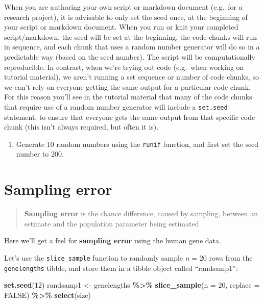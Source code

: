 \documentclass[
]{book}
\newenvironment{Shaded}{\begin{snugshade}}{\end{snugshade}}
\newcommand{\AttributeTok}[1]{\textcolor[rgb]{0.13,0.29,0.53}{#1}}
\newcommand{\ConstantTok}[1]{\textcolor[rgb]{0.56,0.35,0.01}{#1}}
\newcommand{\DecValTok}[1]{\textcolor[rgb]{0.00,0.00,0.81}{#1}}
\newcommand{\FunctionTok}[1]{\textcolor[rgb]{0.13,0.29,0.53}{\textbf{#1}}}
\newcommand{\NormalTok}[1]{#1}
\newcommand{\OtherTok}[1]{\textcolor[rgb]{0.56,0.35,0.01}{#1}}
\newcommand{\SpecialCharTok}[1]{\textcolor[rgb]{0.81,0.36,0.00}{\textbf{#1}}}
\providecommand{\tightlist}{%
  \setlength{\itemsep}{0pt}\setlength{\parskip}{0pt}}
\begin{document}
When you are authoring your own script or markdown document (e.g.~for a research project), it is advisable to only set the seed once, at the beginning of your script or markdown document. When you run or knit your completed script/markdown, the seed will be set at the beginning, the code chunks will run in sequence, and each chunk that uses a random number generator will do so in a predictable way (based on the seed number). The script will be computationally reproducible. In contrast, when we're trying out code (e.g.~when working on tutorial material), we aren't running a set sequence or number of code chunks, so we can't rely on everyone getting the same output for a particular code chunk. For this reason you'll see in the tutorial material that many of the code chunks that require use of a random number generator will include a \texttt{set.seed} statement, to ensure that everyone gets the same output from that specific code chunk (this isn't always required, but often it is).

\begin{enumerate}
\def\labelenumi{\arabic{enumi}.}
\tightlist
\item
  Generate 10 random numbers using the \texttt{runif} function, and first set the seed number to 200.
\end{enumerate}

\section{Sampling error}\label{sampling_error}

\begin{quote}
\textbf{Sampling error} is the chance difference, caused by sampling, between an estimate and the population parameter being estimated
\end{quote}

Here we'll get a feel for \textbf{sampling error} using the human gene data.

Let's use the \texttt{slice\_sample} function to randomly sample \emph{n} = 20 rows from the \texttt{genelengths} tibble, and store them in a tibble object called ``randsamp1'':

\begin{Shaded}
\begin{Highlighting}[]
\FunctionTok{set.seed}\NormalTok{(}\DecValTok{12}\NormalTok{)}
\NormalTok{randsamp1 }\OtherTok{\textless{}{-}}\NormalTok{ genelengths }\SpecialCharTok{\%\textgreater{}\%}
  \FunctionTok{slice\_sample}\NormalTok{(}\AttributeTok{n =} \DecValTok{20}\NormalTok{, }\AttributeTok{replace =} \ConstantTok{FALSE}\NormalTok{) }\SpecialCharTok{\%\textgreater{}\%}
  \FunctionTok{select}\NormalTok{(size)}
\end{Highlighting}
\end{Shaded}
\end{document}
